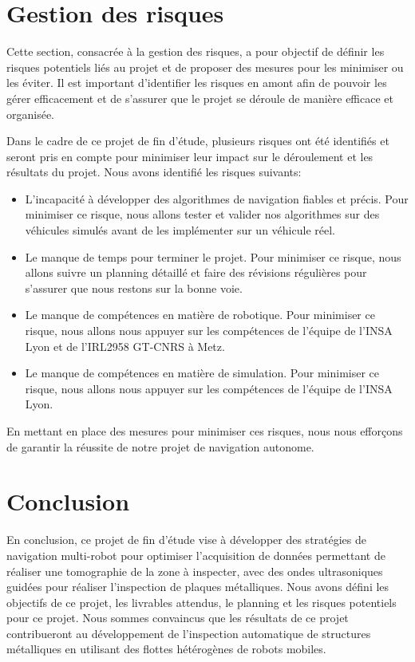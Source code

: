\documentclass[init,francais,RandD]{rapportPFE}  %
\begin{document}
	\section{Gestion des risques}
		Cette section, consacrée à la gestion des risques, a pour objectif de définir les risques potentiels liés au projet et de proposer des mesures pour les minimiser ou les éviter. Il est important d'identifier les risques en amont afin de pouvoir les gérer efficacement et de s'assurer que le projet se déroule de manière efficace et organisée.

		Dans le cadre de ce projet de fin d'étude, plusieurs risques ont été identifiés et seront pris en compte pour minimiser leur impact sur le déroulement et les résultats du projet. Nous avons identifié les risques suivants:
		\begin{itemize}
			\item L'incapacité à développer des algorithmes de navigation fiables et précis. Pour minimiser ce risque, nous allons tester et valider nos algorithmes sur des véhicules simulés avant de les implémenter sur un véhicule réel.
			\item Le manque de temps pour terminer le projet. Pour minimiser ce risque, nous allons suivre un planning détaillé et faire des révisions régulières pour s'assurer que nous restons sur la bonne voie.
			\item Le manque de compétences en matière de robotique. Pour minimiser ce risque, nous allons nous appuyer sur les compétences de l'équipe de l'INSA Lyon et de l'IRL2958 GT-CNRS à Metz.
			\item Le manque de compétences en matière de simulation. Pour minimiser ce risque, nous allons nous appuyer sur les compétences de l'équipe de l'INSA Lyon.
		\end{itemize}
		En mettant en place des mesures pour minimiser ces risques, nous nous efforçons de garantir la réussite de notre projet de navigation autonome.
	\section{Conclusion}
		En conclusion, ce projet de fin d'étude vise à développer des stratégies de navigation multi-robot pour optimiser l'acquisition de données permettant de réaliser une tomographie de la zone à inspecter, avec des ondes ultrasoniques guidées pour réaliser l'inspection de plaques métalliques. Nous avons défini les objectifs de ce projet, les livrables attendus, le planning et les risques potentiels pour ce projet. Nous sommes convaincus que les résultats de ce projet contribueront au développement de l'inspection automatique de structures métalliques en utilisant des flottes hétérogènes de robots mobiles.
\end{document}
